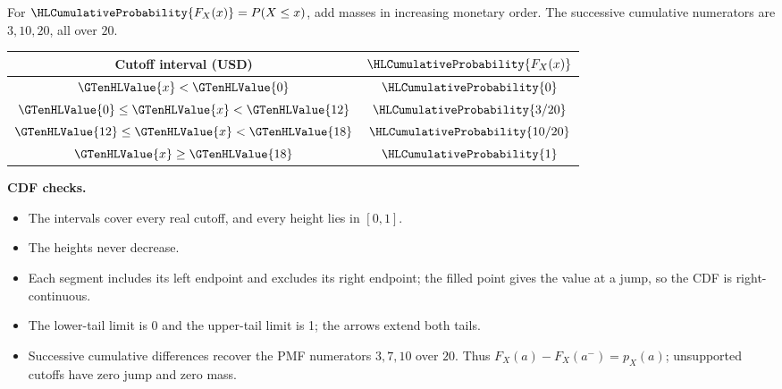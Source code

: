 For $\HLCumulativeProbability{F_X(x)}=P(X\leq x)$, add masses in increasing monetary order. The successive cumulative numerators are $3,10,20$, all over $20$.
\begin{center}
\begin{tabular}{cc}\toprule
Cutoff interval (USD) & $\HLCumulativeProbability{F_X(x)}$\\
\midrule
$\GTenHLValue{x}<\GTenHLValue{0}$ & $\HLCumulativeProbability{0}$\\
$\GTenHLValue{0}\leq \GTenHLValue{x}<\GTenHLValue{12}$ & $\HLCumulativeProbability{3/20}$\\
$\GTenHLValue{12}\leq \GTenHLValue{x}<\GTenHLValue{18}$ & $\HLCumulativeProbability{10/20}$\\
$\GTenHLValue{x}\geq \GTenHLValue{18}$ & $\HLCumulativeProbability{1}$\\
\bottomrule\end{tabular}
\end{center}
\begin{center}\end{center}\textbf{CDF checks.}\begin{itemize}\item The intervals cover every real cutoff, and every height lies in $[0,1]$.\item The heights never decrease.\item Each segment includes its left endpoint and excludes its right endpoint; the filled point gives the value at a jump, so the CDF is right-continuous.\item The lower-tail limit is 0 and the upper-tail limit is 1; the arrows extend both tails.\item Successive cumulative differences recover the PMF numerators $3,7,10$ over $20$. Thus $F_X(a)-F_X(a^-)=p_X(a)$; unsupported cutoffs have zero jump and zero mass.\end{itemize}

